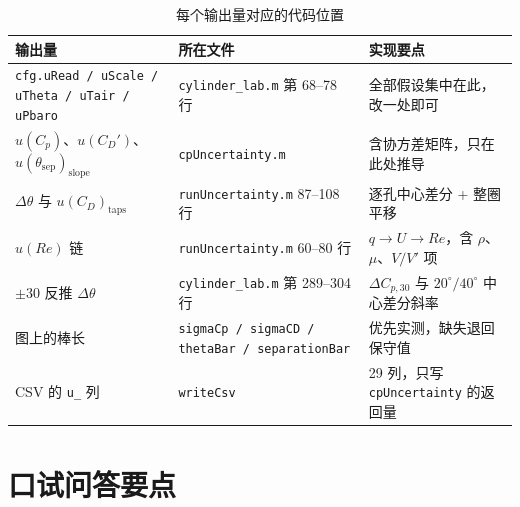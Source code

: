 \documentclass[11pt,a4paper]{ctexart}
\newcommand{\Cp}{\ensuremath{C_p}}
\newcommand{\CD}{\ensuremath{C_D}}
\newcommand{\ReD}{\ensuremath{\mathit{Re}}}
\begin{document}
\begin{table}[H]
\centering
\caption{每个输出量对应的代码位置}
\small
\begin{tabularx}{\textwidth}{@{}p{5.0cm} p{4.6cm} X@{}}
\toprule
输出量 & 所在文件 & 实现要点 \\
\midrule
\texttt{cfg.uRead / uScale / uTheta / uTair / uPbaro} & \texttt{cylinder\_lab.m} 第 68--78 行 &
全部假设集中在此，改一处即可 \\
$u(\Cp)$、$u(\CD')$、$u(\theta_{\text{sep}})_{\text{slope}}$ & \texttt{cpUncertainty.m} &
含协方差矩阵，只在此处推导 \\
$\Delta\theta$ 与 $u(\CD)_{\text{taps}}$ & \texttt{runUncertainty.m} 87--108 行 &
逐孔中心差分 + 整圈平移 \\
$u(\ReD)$ 链 & \texttt{runUncertainty.m} 60--80 行 &
$q \to U \to \ReD$，含 $\rho$、$\mu$、$V/V'$ 项 \\
$\pm30$ 反推 $\Delta\theta$ & \texttt{cylinder\_lab.m} 第 289--304 行 &
$\Delta C_{p,30}$ 与 $20^\circ/40^\circ$ 中心差分斜率 \\
图上的棒长 & \texttt{sigmaCp / sigmaCD / thetaBar / separationBar} & 优先实测，缺失退回保守值 \\
CSV 的 \texttt{u\_} 列 & \texttt{writeCsv} & 29 列，只写 \texttt{cpUncertainty} 的返回量 \\
\bottomrule
\end{tabularx}
\end{table}

\section{口试问答要点}
\end{document}
